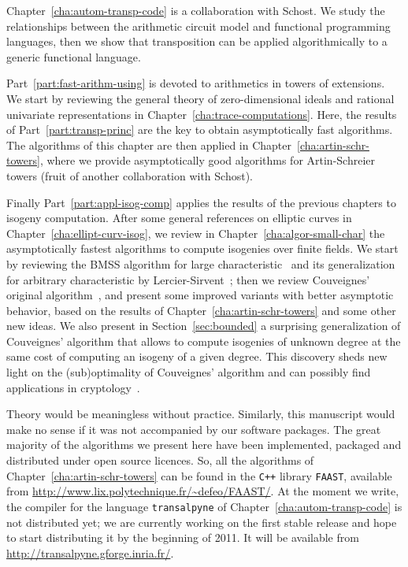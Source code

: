 Chapter~\ref{cha:autom-transp-code} is a collaboration with Schost. We
study the relationships between the arithmetic circuit model and
functional programming languages, then we show that transposition can
be applied algorithmically to a generic functional language. 

Part~\ref{part:fast-arithm-using} is devoted to arithmetics in towers
of extensions. We start by reviewing the general theory of
zero-dimensional ideals and rational univariate representations in
Chapter~\ref{cha:trace-computations}. Here, the results of
Part~\ref{part:transp-princ} are the key to obtain asymptotically fast
algorithms. The algorithms of this chapter are then applied in
Chapter~\ref{cha:artin-schr-towers}, where we provide asymptotically
good algorithms for Artin-Schreier towers (fruit of another
collaboration with Schost).

Finally Part~\ref{part:appl-isog-comp} applies the results of the
previous chapters to isogeny computation. After some general
references on elliptic curves in Chapter~\ref{cha:ellipt-curv-isog},
we review in Chapter~\ref{cha:algor-small-char} the asymptotically
fastest algorithms to compute isogenies over finite fields.  We start
by reviewing the BMSS algorithm for large
characteristic~\cite{bostan+morain+salvy+schost08} and its
generalization for arbitrary characteristic by
Lercier-Sirvent~\cite{lercier+sirvent08}; then we review Couveignes'
original algorithm~\cite{couveignes96}, and present some improved
variants with better asymptotic behavior, based on the results of
Chapter~\ref{cha:artin-schr-towers} and some other new ideas.  We also
present in Section~\ref{sec:bounded} a surprising generalization of
Couveignes' algorithm that allows to compute isogenies of unknown
degree at the same cost of computing an isogeny of a given degree.
This discovery sheds new light on the (sub)optimality of Couveignes'
algorithm and can possibly find applications in
cryptology~\cite{gaudry+hess+smart02,GHS,hess03,teske06}.

Theory would be meaningless without practice. Similarly, this
manuscript would make no sense if it was not accompanied by our
software packages. The great majority of the algorithms we present
here have been implemented, packaged and distributed under open source
licences. So, all the algorithms of
Chapter~\ref{cha:artin-schr-towers} can be found in the \texttt{C++}
library \texttt{FAAST}, available from
\url{http://www.lix.polytechnique.fr/~defeo/FAAST/}. At the
moment we write, the compiler for the language \texttt{transalpyne} of
Chapter~\ref{cha:autom-transp-code} is not distributed yet; we are
currently working on the first stable release and hope to start
distributing it by the beginning of 2011. It will be available from
\url{ http://transalpyne.gforge.inria.fr/}.





